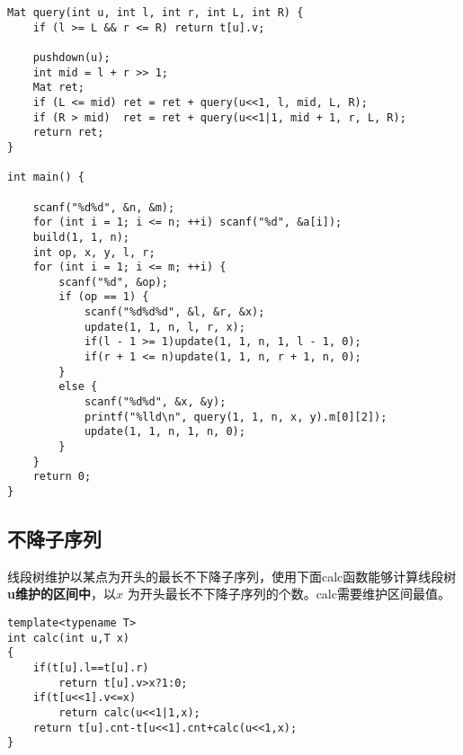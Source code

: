 \begin{verbatim}
Mat query(int u, int l, int r, int L, int R) {
    if (l >= L && r <= R) return t[u].v;
    
    pushdown(u);
    int mid = l + r >> 1;
    Mat ret;
    if (L <= mid) ret = ret + query(u<<1, l, mid, L, R);
    if (R > mid)  ret = ret + query(u<<1|1, mid + 1, r, L, R);
    return ret;
}

int main() {

    scanf("%d%d", &n, &m);
    for (int i = 1; i <= n; ++i) scanf("%d", &a[i]);
    build(1, 1, n);
    int op, x, y, l, r;
    for (int i = 1; i <= m; ++i) {
        scanf("%d", &op);
        if (op == 1) {
            scanf("%d%d%d", &l, &r, &x);
            update(1, 1, n, l, r, x);
            if(l - 1 >= 1)update(1, 1, n, 1, l - 1, 0);
            if(r + 1 <= n)update(1, 1, n, r + 1, n, 0);
        }
        else {
            scanf("%d%d", &x, &y);
            printf("%lld\n", query(1, 1, n, x, y).m[0][2]);
            update(1, 1, n, 1, n, 0);
        }
    }
    return 0;
}
\end{verbatim}
\subsection{不降子序列}
\par \noindent 线段树维护以某点为开头的最长不下降子序列，使用下面calc函数能够计算线段树\textbf{u维护的区间中}，以$x$ 为开头最长不下降子序列的个数。calc需要维护区间最值。

\begin{verbatim}
template<typename T>
int calc(int u,T x)
{
    if(t[u].l==t[u].r) 
        return t[u].v>x?1:0;
    if(t[u<<1].v<=x) 
        return calc(u<<1|1,x);
    return t[u].cnt-t[u<<1].cnt+calc(u<<1,x);
}
\end{verbatim}


